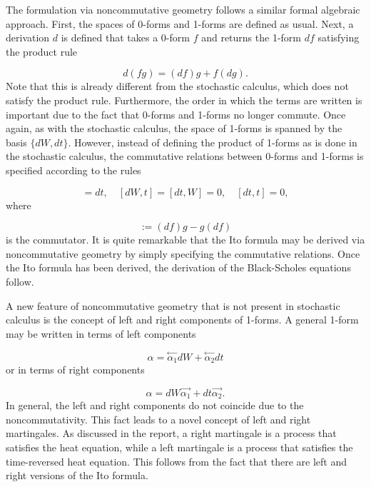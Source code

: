 \documentclass[preprint, 5p, 10pt]{elsarticle}
\theoremstyle{plain}
\begin{document}
The formulation via noncommutative geometry follows a similar formal algebraic approach.
 First, the spaces of 0-forms and 1-forms are defined as usual. Next, a derivation $d$ is defined that takes a 0-form $f$
 and returns the 1-form $d f$ satisfying the product rule

\begin{displaymath}
d(f g) = (d f)g + f(d g).
\end{displaymath}
Note that this is already different from the stochastic calculus, which does not satisfy the product rule. Furthermore,
 the order in which the terms are written is important due to the fact that 0-forms and 1-forms no longer commute. 
Once again, as with the stochastic calculus, the space of 1-forms is spanned by the basis $\{d W, d t\}$. 
However, instead of defining the product of 1-forms as is done in the stochastic calculus, 
the commutative relations between 0-forms and 1-forms is specified according to the rules

\begin{displaymath}
[d W,W] = dt,\quad [d W,t] = [d t,W] = 0,\quad [d t,t] = 0
,
\end{displaymath}
where

\begin{displaymath}
[d f,g] := (d f)g - g(d f)
\end{displaymath}
is the commutator. It is quite remarkable that the Ito formula may be derived via noncommutative geometry by 
simply specifying the commutative relations. Once the Ito formula has been derived, the derivation of the Black-Scholes equations follow.

A new feature of noncommutative geometry that is not present in stochastic calculus is the concept of left and right components of 1-forms. A general 1-form may be written in terms of left components

\begin{displaymath}
\alpha = \stackrel{\leftarrow}{\alpha_1} d W + \stackrel{\leftarrow}{\alpha_2} d t
\end{displaymath}
or in terms of right components

\begin{displaymath}
\alpha = d W \stackrel{\rightarrow}{\alpha_1} + d t\stackrel{\rightarrow}{\alpha_2}.
\end{displaymath}
In general, the left and right components do not coincide due to the noncommutativity. This fact leads to a novel concept of left and right martingales. As discussed in the report, a right martingale is a process that satisfies the heat equation, while a left martingale is a process that satisfies the time-reversed heat equation. This follows from the fact that there are left and right versions of the Ito formula.
\end{document}
